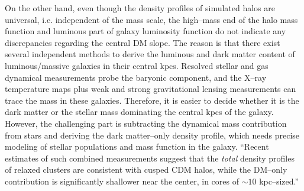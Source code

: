 \documentclass[paper=a4, fontsize=11pt]{scrartcl} %
\numberwithin{equation}{section} %
\numberwithin{figure}{section} %
\numberwithin{table}{section} %
\begin{document}
On the other hand, even though the density profiles of simulated halos are universal, i.e. independent of the mass scale, the high--mass end of the halo mass function and luminous part of galaxy luminosity function do not indicate any discrepancies regarding the central DM slope. The reason is that there exist several independent methods to derive the luminous and dark matter content of luminous/massive galaxies in their central kpcs. Resolved stellar and gas dynamical measurements probe the baryonic component, and the X--ray temperature maps plus weak and strong gravitational lensing measurements can trace the mass in these galaxies. Therefore, it is easier to decide whether it is the dark matter or the stellar mass dominating the central kpcs of the galaxy. However, the challenging part is subtracting the dynamical mass contribution from stars and deriving the dark matter--only density profile, which needs precise modeling of stellar populations and mass function in the galaxy. ``Recent estimates of such combined measurements suggest that the \emph{total} density profiles of relaxed clusters are consistent with cusped CDM halos, while the DM--only contribution is significantly shallower near the center, in cores of $\sim 10$ kpc--sized.''
\end{document}
